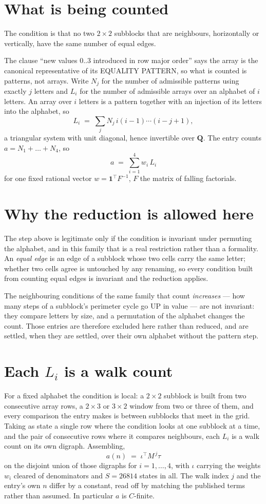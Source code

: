 \documentclass[11pt,a4paper]{article}
\theoremstyle{plain}
\theoremstyle{definition}
\begin{document}
\section{What is being counted}

The condition is that no two $2\times2$ subblocks that are neighbours, horizontally or vertically, have the same number of equal edges.

The clause ``new values $0..3$ introduced in row major order'' says the array is the
canonical representative of its EQUALITY PATTERN, so what is counted is patterns, not arrays.
Write $N_j$ for the number of admissible patterns using exactly $j$ letters and $L_i$ for the
number of admissible arrays over an alphabet of $i$ letters. An array over $i$ letters is a
pattern together with an injection of its letters into the alphabet, so
\[
L_i\;=\;\sum_j N_j\,i(i-1)\cdots(i-j+1),
\]
a triangular system with unit diagonal, hence invertible over $\mathbf{Q}$. The entry counts
$a=N_1+\dots+N_{4}$, so
\[
a\;=\;\sum_{i=1}^{4}w_i\,L_i
\]
for one fixed rational vector $w=\mathbf{1}^{\!\top}F^{-1}$, $F$ the matrix of falling
factorials.

\section{Why the reduction is allowed here}

The step above is legitimate only if the condition is invariant under permuting the alphabet,
and in this family that is a real restriction rather than a formality. An \emph{equal edge}
is an edge of a subblock whose two cells carry the same letter; whether two cells agree is
untouched by any renaming, so every condition built from counting equal edges is invariant and
the reduction applies.

The neighbouring conditions of the same family that count \emph{increases} --- how many steps
of a subblock's perimeter cycle go UP in value --- are not invariant: they compare letters by
size, and a permutation of the alphabet changes the count. Those entries are therefore excluded
here rather than reduced, and are settled, when they are settled, over their own alphabet
without the pattern step.

\section{Each $L_i$ is a walk count}

For a fixed alphabet the condition is local: a $2\times2$ subblock is built from two
consecutive array rows, a $2\times3$ or $3\times2$ window from two or three of them, and every
comparison the entry makes is between subblocks that meet in the grid. Taking as state a single
row where the condition looks at one subblock at a time, and the pair of consecutive rows where
it compares neighbours, each $L_i$ is a walk count on its own digraph. Assembling,
\[
a(n)\;=\;\iota^{\!\top}M^{\,j}\tau
\]
on the disjoint union of those digraphs for $i=1,\dots,4$, with $\iota$ carrying the weights
$w_i$ cleared of denominators and $S=26814$ states in all. The walk index $j$ and the entry's own
$n$ differ by a constant, read off by matching the published terms rather than assumed. In
particular $a$ is $C$-finite.
\end{document}
